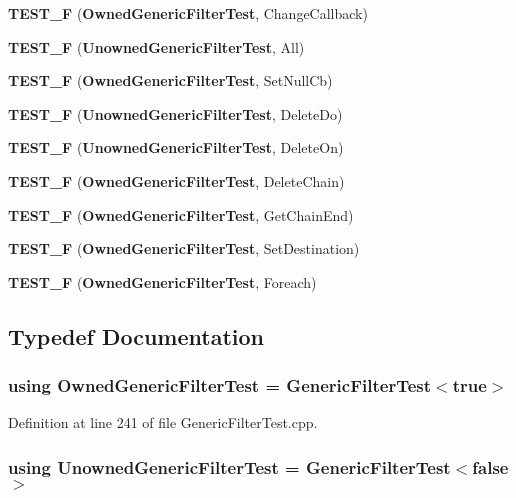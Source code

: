 \begin{DoxyCompactItemize}
{\bf T\+E\+S\+T\+\_\+F} ({\bf Owned\+Generic\+Filter\+Test}, Change\+Callback)
\item 
{\bf T\+E\+S\+T\+\_\+F} ({\bf Unowned\+Generic\+Filter\+Test}, All)
\item 
{\bf T\+E\+S\+T\+\_\+F} ({\bf Owned\+Generic\+Filter\+Test}, Set\+Null\+Cb)
\item 
{\bf T\+E\+S\+T\+\_\+F} ({\bf Unowned\+Generic\+Filter\+Test}, Delete\+Do)
\item 
{\bf T\+E\+S\+T\+\_\+F} ({\bf Unowned\+Generic\+Filter\+Test}, Delete\+On)
\item 
{\bf T\+E\+S\+T\+\_\+F} ({\bf Owned\+Generic\+Filter\+Test}, Delete\+Chain)
\item 
{\bf T\+E\+S\+T\+\_\+F} ({\bf Owned\+Generic\+Filter\+Test}, Get\+Chain\+End)
\item 
{\bf T\+E\+S\+T\+\_\+F} ({\bf Owned\+Generic\+Filter\+Test}, Set\+Destination)
\item 
{\bf T\+E\+S\+T\+\_\+F} ({\bf Owned\+Generic\+Filter\+Test}, Foreach)
\end{DoxyCompactItemize}


\subsection{Typedef Documentation}
\subsubsection[{Owned\+Generic\+Filter\+Test}]{\setlength{\rightskip}{0pt plus 5cm}using {\bf Owned\+Generic\+Filter\+Test} =  {\bf Generic\+Filter\+Test}$<$true$>$}\label{GenericFilterTest_8cpp_a37b522e117bf310a221a30ca9fd99f34}


Definition at line 241 of file Generic\+Filter\+Test.\+cpp.

\subsubsection[{Unowned\+Generic\+Filter\+Test}]{\setlength{\rightskip}{0pt plus 5cm}using {\bf Unowned\+Generic\+Filter\+Test} =  {\bf Generic\+Filter\+Test}$<$false$>$}\label{GenericFilterTest_8cpp_ad1383889def8e3e93fe9491cbb2da83a}


